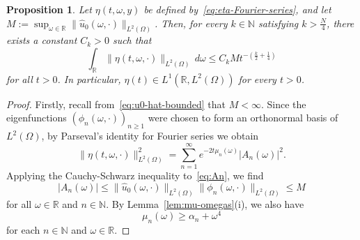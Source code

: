 \documentclass[a4paper, reqno,titlepage]{amsart}
\numberwithin{equation}{section}
\theoremstyle{plain}
\newtheorem{proposition}[theorem]{Proposition}
\theoremstyle{definition}
\theoremstyle{remark}
\newcommand{\NN}{\mathbb{N}}
\newcommand{\RR}{\mathbb{R}}
\begin{document}
\begin{proposition}
  \label{prop:eta-series}
  Let $\eta(t, \omega, y)$ be defined by~\eqref{eq:eta-Fourier-series}, and let $M:=\sup_{\omega\in\RR}\|\hat{u}_0(\omega,\cdot)\|_{L^2(\Omega)}$. Then, for every $k\in\NN$ satisfying $k>\frac{N}{4}$, there exists a constant $C_k>0$ such that
  \begin{equation}
    \label{eq:eta-Fourier-series-estimate}
    \int_\RR \| \eta(t, \omega, \cdot) \|_{L^2(\Omega)} \,d\omega
    \leq C_k M t^{-(\frac{k}{2}+\frac{1}{4})}
  \end{equation}
  for all $t>0$. In particular, $\eta(t) \in L^1(\RR,L^2(\Omega))$ for every $t>0$.
\end{proposition}
\begin{proof}
  Firstly, recall from~\eqref{eq:u0-hat-bounded} that $M<\infty$. Since the eigenfunctions $(\phi_n(\omega, \cdot))_{n \ge 1}$ were chosen to form an orthonormal basis of $L^2(\Omega)$, by Parseval's identity for Fourier series we obtain
  \begin{equation}
  \label{eq:eta-L2-norm}
  	\| \eta(t, \omega, \cdot) \|_{L^2(\Omega)}^2 = \sum_{n=1}^\infty e^{-2t\mu_n(\omega)} |A_n(\omega)|^2.
  \end{equation}
 Applying the Cauchy-Schwarz inequality to~\eqref{eq:An}, we find
 \begin{equation}
 \label{eq:eta-Fourier-series-estimate-sup}
 	|A_n(\omega)| \le \|\hat{u}_0(\omega,\cdot)\|_{L^2(\Omega)} \|\phi_n(\omega,\cdot)\|_{L^2(\Omega)} \le M
 \end{equation}
 for all $\omega\in\RR$ and $n\in\NN$. By Lemma~\ref{lem:mu-omegas}(i), we also have
 \begin{equation*}
 	\mu_n(\omega) \ge \alpha_n + \omega^4
 \end{equation*}
 for each $n \in \NN$ and $\omega\in\RR$.
 

\end{proof}
\end{document}
